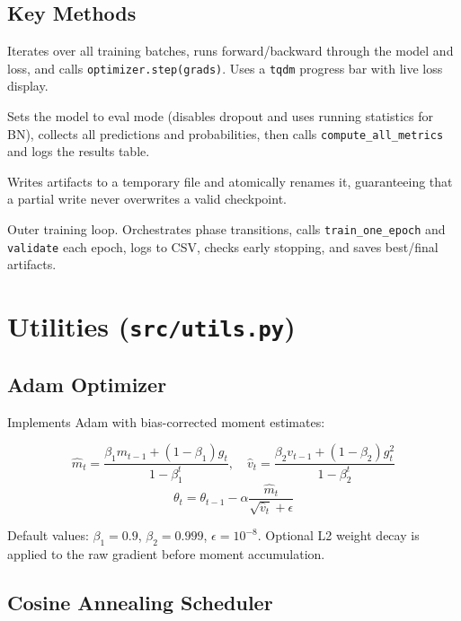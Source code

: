 \documentclass[12pt,a4paper]{report}
\begin{document}
\subsection{Key Methods}

\begin{description}[leftmargin=0pt, style=nextline]
  \item[\texttt{train\_one\_epoch}]
    Iterates over all training batches, runs forward/backward through the model and loss, and calls \texttt{optimizer.step(grads)}. Uses a \texttt{tqdm} progress bar with live loss display.

  \item[\texttt{validate}]
    Sets the model to eval mode (disables dropout and uses running statistics for BN), collects all predictions and probabilities, then calls \texttt{compute\_all\_metrics} and logs the results table.

  \item[\texttt{\_atomic\_save}]
    Writes artifacts to a temporary file and atomically renames it, guaranteeing that a partial write never overwrites a valid checkpoint.

  \item[\texttt{fit}]
    Outer training loop. Orchestrates phase transitions, calls \texttt{train\_one\_epoch} and \texttt{validate} each epoch, logs to CSV, checks early stopping, and saves best/final artifacts.
\end{description}

\section{Utilities (\texttt{src/utils.py})}

\subsection{Adam Optimizer}

Implements Adam with bias-corrected moment estimates:

\[
  \hat{m}_t = \frac{\beta_1 m_{t-1} + (1-\beta_1)g_t}{1-\beta_1^t}, \quad
  \hat{v}_t = \frac{\beta_2 v_{t-1} + (1-\beta_2)g_t^2}{1-\beta_2^t}
\]
\[
  \theta_t = \theta_{t-1} - \alpha \frac{\hat{m}_t}{\sqrt{\hat{v}_t}+\epsilon}
\]

Default values: $\beta_1=0.9$, $\beta_2=0.999$, $\epsilon=10^{-8}$. Optional L2 weight decay is applied to the raw gradient before moment accumulation.

\subsection{Cosine Annealing Scheduler}
\end{document}
